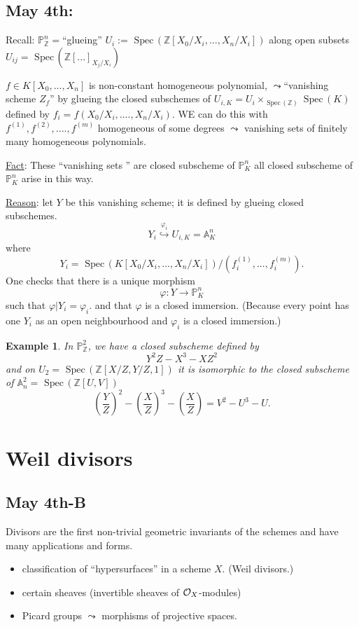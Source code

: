 \documentclass[11pt]{article}
\newtheorem{ex}[thm]{Example}
\newcommand{\spec}{\text{ Spec}\,}
\newcommand{\affn}{\mathbb A}
\newcommand{\proj}{\mathbb P}
\newcommand{\intg}{\mathbb Z}
\newcommand{\calo}{{\cal O}}
\newcommand{\lrta}{\longrightarrow}
\newcommand{\inj}{\hookrightarrow}
\begin{document}
\subsection{May 4th: }
Recall: $\proj^n_\intg=$``glueing'' $U_i:=\spec(\intg[
X_0/X_i,..., X_n/X_i])$ along open subsets $U_{ij}=\spec(\intg[...]_{X_j/X_i})$

$f\in K[X_0,...,X_n]$ is non-constant homogeneous polynomial, $\leadsto$``vanishing scheme $Z_f$'' by  glueing the closed subschemes of $U_{i,K}=U_i\times_{\spec(\intg)}\spec (K)$ defined by $f_i=f(X_0/X_i,....,X_n/X_i)$. WE can do this with $f^{(1)},f^{(2)},....,f^{(m)}$ homogeneous of some degrees $\leadsto $ vanishing sets of finitely many homogeneous polynomials.

\underline{Fact}: These ``vanishing sets '' are closed subscheme of $\proj^n_K$ all closed subscheme of $\proj^n_K$ arise in this way.

\underline{Reason}: let $Y$ be this vanishing scheme; it is defined by glueing closed subschemes.
$$
Y_i\overset{\varphi_i}{\inj} U_{i,K}=\affn^n_K
$$
where 
$$
Y_i=\spec(K[X_0/X_i,...,X_n/X_i])/(f_i^{(1)},...,f_i^{(m)}).  
$$
One checks that there is a unique morphism
$$
\varphi:Y\lrta \proj^n_K
$$
such that  $\varphi|Y_i=\varphi_i$. and that $\varphi$ is a closed immersion. (Because every point has one $Y_i$ as an open neighbourhood
and $\varphi_i$ is a closed immersion.)

\begin{ex}
In $\proj^2_\intg$, we have a closed subscheme defined by 
$$
Y^2Z-X^3-XZ^2
$$
and on $U_2=\spec(\intg[X/Z,Y/Z,1])$ it is isomorphic to the closed subscheme of $\affn^2_n=\spec(\intg[U,V])$
$$
\left(\frac{Y}{Z}\right)^2-\left(\frac{X}{Z}\right)^3-\left(\frac{X}{Z}\right)=V^2-U^3-U.
$$
\end{ex}


\section{Weil divisors}
\subsection{May 4th-B}
Divisors are the first non-trivial geometric invariants of the schemes and have many applications and forms.
\begin{itemize}
	\item classification of ``hypersurfaces'' in a scheme $X$. (Weil divisors.)
	\item certain sheaves (invertible sheaves of $\calo_X$-modules)
	\item Picard groups $\leadsto$ morphisms of projective spaces.
\end{itemize}
\end{document}
